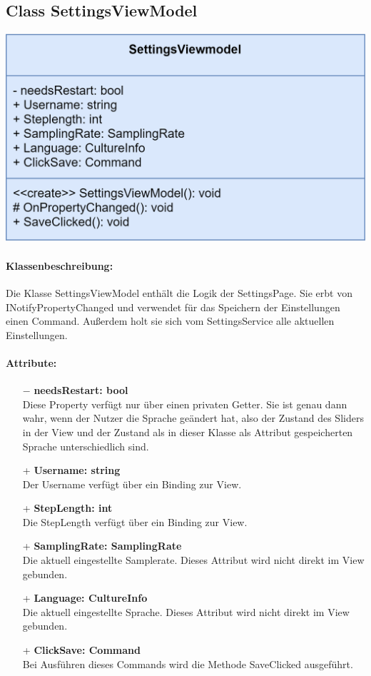 \documentclass[a4paper,12pt]{article}
\begin{document}
	\subsection{Class SettingsViewModel}

	\includegraphics{bilder/ViewModelKlassen/SettingsViewModel.png}
\paragraph{Klassenbeschreibung:}
Die Klasse SettingsViewModel enthält die Logik der SettingsPage. Sie erbt von INotifyPropertyChanged und verwendet für das Speichern der Einstellungen einen Command. Außerdem holt sie sich vom SettingsService alle aktuellen Einstellungen.
\paragraph{Attribute:}
\begin{itemize}
	\item[$-$] \textbf{needsRestart: bool}\\ Diese Property verfügt nur über einen privaten Getter. Sie ist genau dann wahr, wenn der Nutzer die Sprache geändert hat, also der Zustand des Sliders in der View und der Zustand als in dieser Klasse als Attribut gespeicherten Sprache unterschiedlich sind.

	\item[+] \textbf{Username: string}\\Der Username verfügt über ein Binding zur View.
	\item[+] \textbf{StepLength: int}\\Die StepLength verfügt über ein Binding zur View. 
	\item[+] \textbf{SamplingRate: SamplingRate}\\Die aktuell eingestellte Samplerate. Dieses Attribut wird nicht direkt im View gebunden.
	\item[+] \textbf{Language: CultureInfo}\\Die aktuell eingestellte Sprache. Dieses Attribut wird nicht direkt im View gebunden. 
	\item[+] \textbf{ClickSave: Command}\\Bei Ausführen dieses Commands wird die Methode SaveClicked ausgeführt. 
\end{itemize}
\end{document}
